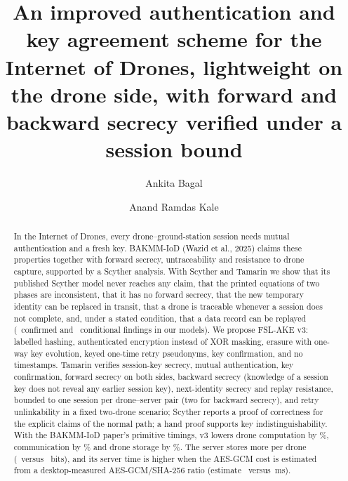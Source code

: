 \documentclass[a4paper,fleqn]{\casclass}
\makeatletter
\DeclareRobustCommand{\_}{\ifmmode\nfss@text{\textunderscore}\else\textunderscore\allowbreak\fi}
\makeatother
\begin{document}
\let\WriteBookmarks\relax

\shorttitle{}

\title[mode=title]{An improved authentication and key agreement scheme for the Internet of Drones, lightweight on the drone side, with forward and backward secrecy verified under a session bound}

\author[1]{Ankita Bagal}

\author[1]{Anand Ramdas Kale}



\begin{abstract}
In the Internet of Drones, every drone--ground-station session needs mutual authentication and a fresh key. BAKMM-IoD
(Wazid et al., 2025) claims these properties together with forward secrecy, untraceability and resistance to drone capture,
supported by a Scyther analysis. With Scyther and Tamarin we show that its published Scyther model never reaches any claim, that
the printed equations of two phases are inconsistent, that it has no forward secrecy, that the new temporary identity can be
replaced in transit, that a drone is traceable whenever a session does not complete, and, under a stated condition, that a data
record can be replayed (\NumFlawsConfirmed\ confirmed and \NumFlawsConditional\ conditional findings in our models).
We propose FSL-AKE v3: labelled hashing, authenticated encryption instead of XOR masking, erasure with one-way key evolution,
keyed one-time retry pseudonyms, key confirmation, and no timestamps. Tamarin verifies session-key secrecy, mutual
authentication, key confirmation, forward secrecy on both sides, backward secrecy (knowledge of a session key does not reveal
any earlier session key), next-identity secrecy and replay resistance, bounded to one session per drone--server pair (two for
backward secrecy), and retry unlinkability in a fixed two-drone scenario; Scyther reports a proof of correctness for the
explicit claims of the normal path; a hand
proof supports key indistinguishability. With the BAKMM-IoD paper's primitive timings, v3 lowers drone computation by
\PctDrone\%, communication by \PctBits\% and drone storage by \PctStoreDrone\%. The server stores more per drone
(\StoreServerVthree\ versus \StoreServerBakmm\ bits), and its server time is higher when the AES-GCM cost is estimated
from a desktop-measured AES-GCM/SHA-256 ratio (estimate \CostServerWithAEAD\ versus \CostServerBakmm\,ms).
\end{abstract}
\end{document}
